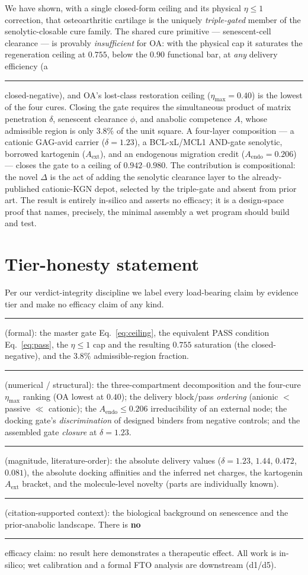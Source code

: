 \documentclass[11pt,a4paper]{article}
\newcommand{\tierdisc}[1]{\textcolor{#1}{\rule[0.05ex]{1.0ex}{1.0ex}}}
\newcommand{\tierBlue}{\tierdisc{blue!70!black}}   %
\newcommand{\tierGreen}{\tierdisc{green!60!black}} %
\newcommand{\tierYellow}{\tierdisc{yellow!85!black}} %
\newcommand{\tierOrange}{\tierdisc{orange!90!black}} %
\newcommand{\tierRed}{\tierdisc{red!80!black}}     %
\begin{document}
We have shown, with a single closed-form ceiling and its physical $\eta\le1$
correction, that osteoarthritic cartilage is the uniquely \emph{triple-gated}
member of the senolytic-closable cure family. The shared cure primitive ---
senescent-cell clearance --- is provably \emph{insufficient} for OA: with the
physical cap it saturates the regeneration ceiling at $0.755$, below the $0.90$
functional bar, at \emph{any} delivery efficiency (a \tierBlue{} closed-negative),
and OA's lost-class restoration ceiling ($\eta_{\max}=0.40$) is the lowest of the
four cures. Closing the gate requires the simultaneous product of matrix
penetration $\delta$, senescent clearance $\phi$, and anabolic competence $A$,
whose admissible region is only $3.8\%$ of the unit square. A four-layer
composition --- a cationic GAG-avid carrier ($\delta=1.23$), a BCL-xL/MCL1 AND-gate
senolytic, borrowed kartogenin ($A_{\mathrm{ext}}$), and an endogenous migration
credit ($A_{\mathrm{endo}}=0.206$) --- closes the gate to a ceiling of
$0.942$--$0.980$. The contribution is compositional: the novel $\Delta$ is the act
of adding the senolytic clearance layer to the already-published cationic-KGN depot,
selected by the triple-gate and absent from prior art. The result is entirely
in-silico and asserts no efficacy; it is a design-space proof that names, precisely,
the minimal assembly a wet program should build and test.

\section*{Tier-honesty statement}

Per our verdict-integrity discipline we label every load-bearing claim by evidence
tier and make no efficacy claim of any kind. \tierBlue{} (formal): the master gate
Eq.~\eqref{eq:ceiling}, the equivalent PASS condition Eq.~\eqref{eq:pass}, the
$\eta\le1$ cap and the resulting $0.755$ saturation (the closed-negative), and the
$3.8\%$ admissible-region fraction. \tierGreen{} (numerical / structural): the
three-compartment decomposition and the four-cure $\eta_{\max}$ ranking (OA lowest
at $0.40$); the delivery block/pass \emph{ordering} (anionic $<$ passive $\ll$
cationic); the $A_{\mathrm{endo}}\le0.206$ irreducibility of an external node; the
docking gate's \emph{discrimination} of designed binders from negative controls;
and the assembled gate \emph{closure} at $\delta=1.23$. \tierOrange{} (magnitude,
literature-order): the absolute delivery values ($\delta=1.23$, $1.44$, $0.472$,
$0.081$), the absolute docking affinities and the inferred net charges, the
kartogenin $A_{\mathrm{ext}}$ bracket, and the molecule-level novelty (parts are
individually known). \tierYellow{} (citation-supported context): the biological
background on senescence and the prior-anabolic landscape. There is \textbf{no}
\tierRed{} efficacy claim: no result here demonstrates a therapeutic effect. All
work is in-silico; wet calibration and a formal FTO analysis are downstream (d1/d5).




\clearpage %


\end{document}
